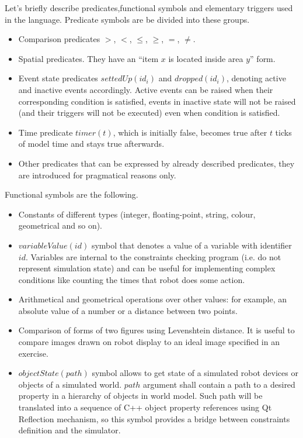 \documentclass[conference]{IEEEtran}
\begin{document}
Let's briefly describe predicates,functional symbols and elementary triggers used in the language. Predicate symbols are be divided into these groups.
\begin{itemize}
    \item Comparison predicates $>$, $<$, $\leq$, $\geq$, $=$, $\neq$.
    \item Spatial predicates. They have an "`item $x$ is located inside area $y$"' form.
    \item Event state predicates $settedUp(id_i)$ and $dropped(id_i)$, denoting active and inactive events accordingly. Active events can be raised when their corresponding condition is satisfied, events in inactive state will not be raised (and their triggers will not be executed) even when condition is satisfied.
    \item Time predicate $timer(t)$, which is initially false, becomes true after $t$ ticks of model time and stays true afterwards.
    \item Other predicates that can be expressed by already described predicates, they are introduced for pragmatical reasons only.
\end{itemize}

Functional symbols are the following.
\begin{itemize}
    \item Constants of different types (integer, floating-point, string, colour, geometrical and so on).
    \item $variableValue(id)$ symbol that denotes a value of a variable with identifier $id$. Variables are internal to the constraints checking program (i.e. do not represent simulation state) and can be useful for implementing complex conditions like counting the times that robot does some action.
    \item Arithmetical and geometrical operations over other values: for example, an absolute value of a number or a distance between two points.
    \item Comparison of forms of two figures using Levenshtein distance. It is useful to compare images drawn on robot display to an ideal image specified in an exercise.
    \item $objectState(path)$ symbol allows to get state of a simulated robot devices or objects of a simulated world. $path$ argument shall contain a path to a desired property in a hierarchy of objects in world model. Such path will be translated into a sequence of C++ object property references using Qt Reflection mechanism, so this symbol provides a bridge between constraints definition and the simulator.
\end{itemize}
\end{document}
